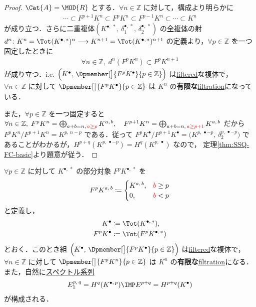 \documentclass[algtopo_main]{subfiles}
\begin{document}
\begin{proof}
    $\Cat{A} = \MOD{R}$ とする．$\forall n \in \mathbb{Z}$ に対して，構成より明らかに
    \begin{align}
        \cdots \subset F^{p+1} K^{n} \subset F^p K^n \subset F^{p-1} K^n \subset \cdots \subset K^n
    \end{align}
    が成り立つ．さらに二重複体$(K^{\bullet,\, *},\, \delta_1^{\bullet,\, *},\, \delta_2^{\bullet,\, *})$ の\hyperref[def:double-complex]{全複体}の射 $d^n \colon K^n = \Tot(K^{\bullet,\, *})^n \lto K^{n+1} = \Tot(K^{\bullet,\, *})^{n+1}$ の定義より，$\forall p \in \mathbb{Z}$ を一つ固定したときに
    \begin{align}
        \forall n \in \mathbb{Z},\; d^n (F^p K^n) \subset F^p K^{n+1}
    \end{align}
    が成り立つ．i.e. $\Bigl( K^\bullet,\, \Dpmember[\big]{F^pK^\bullet}{p \in \mathbb{Z}} \Bigr)$ は\hyperref[def:filtration]{filtered}な複体で，
    $\forall n \in \mathbb{Z}$ に対して $ \Dpmember[\big]{F^pK^\bullet}{p \in \mathbb{Z}}$ は $K^n$ の\textbf{有限な}\hyperref[def:filtration]{filtration}になっている．

    また，$\forall p \in \mathbb{Z}$ を一つ固定すると
    $\forall n \in \mathbb{Z},\;
        F^p K^n = \bigoplus_{a+b = n,\, \textcolor{red}{a \ge p}} K^{a,\, b}, \quad
        F^{p+1} K^n = \bigoplus_{a+b = n,\, \textcolor{red}{a \ge p+1}} K^{a,\, b}
    $
    だから $F^p K^n / F^{p+1} K^n = K^{p,\, n-p}$ である．従って $F^p K^\bullet / F^{p+1} K^\bullet = \bigl( K^{p,\, \bullet - p},\, \delta_2^{p,\, \bullet-p} \bigr)$ であることがわかるが，$H^{p+q}(K^{p,\, \bullet - p}) = H^q(K^{p,\, \bullet})$ なので，
    定理\ref{thm:SSQ-FC-basic}より題意が従う．
\end{proof}

\begin{mycol}[label=SS:double-complex2, breakable]{}
    $\forall p \in \mathbb{Z}$ に対して $K^{\bullet,\, *}$ の部分対象 $F^p K^{\bullet,\, *}$ を
    \begin{align}
        F^p K^{a,\, b} \coloneqq
        \begin{cases}
            K^{a,\, b}, & \textcolor{red}{b} \ge p \\
            0, & \textcolor{red}{b} < p
        \end{cases}
    \end{align}
    と定義し，
    \begin{align}
        K^\bullet &\coloneqq \Tot (K^{\bullet,\, *}), \\
        F^p K^\bullet &\coloneqq \Tot (F^p K^{\bullet,\, *})
    \end{align}
    とおく．このとき組 $\Bigl( K^\bullet,\, \Dpmember[\big]{F^pK^\bullet}{p \in \mathbb{Z}} \Bigr)$ は\hyperref[def:filtration]{filtered}な複体で，
    $\forall n \in \mathbb{Z}$ に対して $ \Dpmember[\big]{F^pK^n}{p \in \mathbb{Z}}$ は $K^n$ の\textbf{有限な}\hyperref[def:filtration]{filtration}になる．
    また，自然に\hyperref[def:SSQ]{スペクトル系列}
    \begin{align}
        E_1^{p,\, q} = H^q(K^{\bullet,\, p}) \IMP E^{p+q} = H^{p+q} (K^\bullet)
    \end{align}
    が構成される．
\end{mycol}
\end{document}
